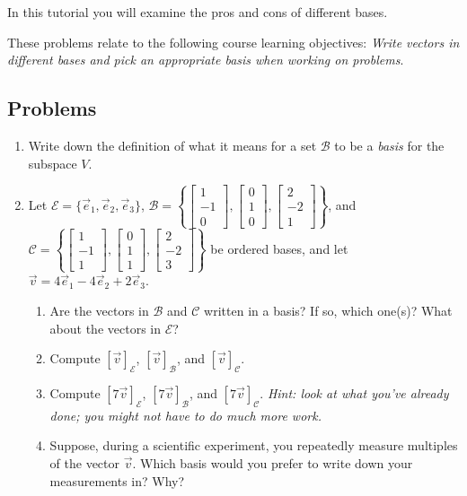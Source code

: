 \documentclass[red]{tutorial}
\newcommand{\mat}[1]{\begin{bmatrix}#1\end{bmatrix}}
\theoremstyle{definition}
\theoremstyle{theorem}
\begin{document}
	\begin{tutorial}

		\begin{objectives}
	In this tutorial you will examine the pros and cons of different bases.

	These problems relate to the following course learning objectives:
	\textit{Write vectors in
different bases and pick an appropriate basis when working on problems}.
		\end{objectives}


\subsection*{Problems}

\begin{enumerate}
	\item Write down the definition of what it means for a set $\mathcal B$ to be a \emph{basis}
		for the subspace $V$.
	\item Let $\mathcal E=\{\vec e_1,\vec e_2,\vec e_3\}$, $\mathcal B=\left\{\mat{1\\-1\\0},\mat{0\\1\\0},\mat{2\\-2\\1}\right\}$,
		and $\mathcal C=\left\{\mat{1\\-1\\1},\mat{0\\1\\1},\mat{2\\-2\\3}\right\}$
		be ordered bases, and let $\vec v=4\vec e_1-4\vec e_2+2\vec e_3$. 
	\begin{enumerate}
		\item Are the vectors in $\mathcal B$ and $\mathcal C$ written in a basis? If so, which one(s)?
			What about the vectors in $\mathcal E$?\
		\item Compute $[\vec v]_{\mathcal E}$, $[\vec v]_{\mathcal B}$, and $[\vec v]_{\mathcal C}$.
		\item Compute $[7\vec v]_{\mathcal E}$, $[7\vec v]_{\mathcal B}$, and $[7\vec v]_{\mathcal C}$. \emph{Hint: look
			at what you've already done; you might not have to do much more work.}
		\item Suppose, during a scientific experiment, you repeatedly measure multiples of the vector $\vec v$. Which
			basis would you prefer to write down your measurements in? Why?

\end{enumerate}
\end{enumerate}
\end{tutorial}
\end{document}
